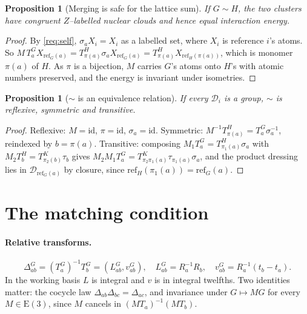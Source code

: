\documentclass[11pt]{article}
\newtheorem{proposition}[theorem]{Proposition}
\theoremstyle{definition}
\newcommand{\Eth}{\mathrm{E}(3)}
\newcommand{\Dgrp}{\mathcal{D}}
\newcommand{\id}{\mathrm{id}}
\newcommand{\inv}{^{-1}}
\begin{document}
\begin{proposition}[Merging is safe for the lattice sum]\label{prop:energy}
If $G\sim H$, the two clusters have congruent $Z$--labelled nuclear clouds and
hence equal interaction energy.
\end{proposition}

\begin{proof}
By \ref{req:self}, $\sigma_a X_i=X_i$ as a labelled set, where $X_i$ is reference
$i$'s atoms. So
$M\,T^G_aX_{\mathrm{ref}_G(a)}=T^H_{\pi(a)}\sigma_aX_{\mathrm{ref}_G(a)}
=T^H_{\pi(a)}X_{\mathrm{ref}_H(\pi(a))}$, which is monomer $\pi(a)$ of $H$. As
$\pi$ is a bijection, $M$ carries $G$'s atoms onto $H$'s with atomic numbers
preserved, and the energy is invariant under isometries.
\end{proof}

\begin{proposition}[$\sim$ is an equivalence relation]\label{prop:equiv}
If every $\Dgrp_i$ is a group, $\sim$ is reflexive, symmetric and transitive.
\end{proposition}

\begin{proof}
Reflexive: $M=\id$, $\pi=\id$, $\sigma_a=\id$. Symmetric: $M\inv
T^H_{\pi(a)}=T^G_a\sigma_a\inv$, reindexed by $b=\pi(a)$. Transitive: composing
$M_1T^G_a=T^H_{\pi_1(a)}\sigma_a$ with $M_2T^H_b=T^K_{\pi_2(b)}\tau_b$ gives
$M_2M_1T^G_a=T^K_{\pi_2\pi_1(a)}\tau_{\pi_1(a)}\sigma_a$, and the product
dressing lies in $\Dgrp_{\mathrm{ref}_G(a)}$ by closure, since
$\mathrm{ref}_H(\pi_1(a))=\mathrm{ref}_G(a)$.
\end{proof}

\section{The matching condition}

\paragraph{Relative transforms.}
\begin{equation}\label{eq:rel}
  \Delta^G_{ab}=(T^G_a)\inv T^G_b=(L^G_{ab},v^G_{ab}),\quad
  L^G_{ab}=R_a\inv R_b,\quad v^G_{ab}=R_a\inv(t_b-t_a).
\end{equation}
In the working basis $L$ is integral and $v$ is in integral twelfths. Two
identities matter: the cocycle law $\Delta_{ab}\Delta_{bc}=\Delta_{ac}$, and
invariance under $G\mapsto MG$ for every $M\in\Eth$, since $M$ cancels in
$(MT_a)\inv(MT_b)$.
\end{document}
